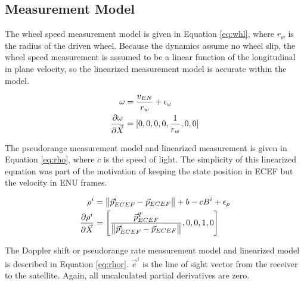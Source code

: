 \documentclass[letterpaper,times]{IONconf}
\begin{document}
\subsection{Measurement Model}

The wheel speed measurement model is given in Equation \eqref{eq:whl}, where $r_w$ is the radius of the driven wheel. Because the dynamics assume no wheel slip, the wheel speed measurement is assumed to be a linear function of the longitudinal in plane velocity, so the linearized measurement model is accurate within the model.

\begin{equation}
    \begin{aligned}
        \omega &= \frac{ v_{EN}}{r_w } + \epsilon_ \omega  \\
        \frac{ \partial \omega }{\partial \vec{X} } &= [0,0,0,0,\frac{ 1}{r_w },0,0]
    \end{aligned} \label{eq:whl}
\end{equation}

The pseudorange measurement model and linearized measurement is given in Equation \eqref{eq:rho}, where $c$ is the speed of light. The simplicity of this linearized equation was part of the motivation of keeping the state position in ECEF but the velocity in ENU frames. 

\newcommand{\norm}[1]{\left\lVert#1\right\rVert}

\begin{equation}
    \begin{aligned}
        \rho^i &= \norm{ \vec{p}^i_{ECEF} - \vec{p}_{ECEF} } + b - cB^i + \epsilon_ \rho \\
        \frac{ \partial \rho^i }{\partial \X } &= \left[\frac{ \vec{p}_{ECEF}^T}{ \norm{ \vec{p}^i_{ECEF} - \vec{p}_{ECEF} } } ,0,0,1,0 \right]
    \end{aligned} \label{eq:rho}
\end{equation}

The Doppler shift or pseudorange rate measurement model and linearized model is described in Equation \eqref{eq:rhor}. $\vec{e}^i$ is the line of sight vector from the receiver to the satellite. Again, all uncalculated partial derivatives are zero.

\newcommand{\prel}{\vec{p}_{rel}}
\end{document}
